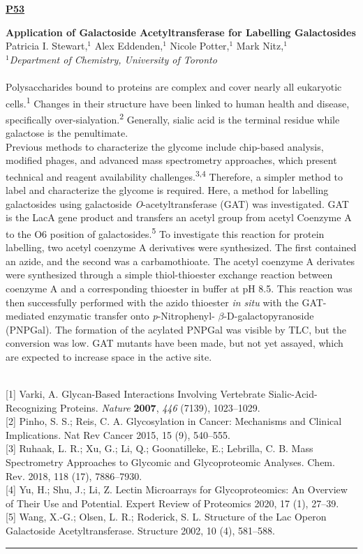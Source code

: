 \documentclass[titlepage,oneside,openany,10pt]{book}
\newenvironment{posterabswref}[5] %
        {
        \newcommand{\posterref}{#5}
	\begin{flushright}
                \underline{\textbf{#4}}
        \end{flushright}
        \textbf{#1}\\%
        #2\\%
        \textit{#3}\\\\%
        }
        {
        \vspace{0.5cm}
        \\\noindent \posterref \\ \noindent\rule{15cm}{0.5pt}%
        }
\begin{document}
\begin{posterabswref}
	{Application of Galactoside Acetyltransferase for Labelling Galactosides}
	{Patricia I. Stewart,$^{1}$ Alex Eddenden,$^{1}$ Nicole Potter,$^{1}$ Mark Nitz,$^{1}$}
	{
	$^1$Department of Chemistry, University of Toronto
	}
	{P53}
	{
	{[1]} Varki, A. Glycan-Based Interactions Involving Vertebrate Sialic-Acid-Recognizing Proteins. \emph{Nature}  \textbf{2007}, \emph{446} (7139), 1023--1029.\\
	{[2]} Pinho, S. S.; Reis, C. A. Glycosylation in Cancer: Mechanisms and Clinical Implications. Nat Rev Cancer 2015, 15 (9), 540--555.\\
	{[3]} Ruhaak, L. R.; Xu, G.; Li, Q.; Goonatilleke, E.; Lebrilla, C. B. Mass Spectrometry Approaches to Glycomic and Glycoproteomic Analyses. Chem. Rev. 2018, 118 (17), 7886--7930.\\
	{[4]} Yu, H.; Shu, J.; Li, Z. Lectin Microarrays for Glycoproteomics: An Overview of Their Use and Potential. Expert Review of Proteomics 2020, 17 (1), 27--39.\\
	{[5]} Wang, X.-G.; Olsen, L. R.; Roderick, S. L. Structure of the Lac Operon Galactoside Acetyltransferase. Structure 2002, 10 (4), 581--588.
	}
	Polysaccharides bound to proteins are complex and cover nearly all eukaryotic cells.\textsuperscript{1} Changes in their structure have been linked to human health and disease, specifically over-sialyation.\textsuperscript{2} Generally, sialic acid is the terminal residue while galactose is the penultimate.\\Previous methods to characterize the glycome include chip-based analysis, modified phages, and advanced mass spectrometry approaches, which present technical and reagent availability challenges.\textsuperscript{3,4} Therefore, a simpler method to label and characterize the glycome is required. Here, a method for labelling galactosides using galactoside \emph{O}-acetyltransferase (GAT) was investigated. GAT is the LacA gene product and transfers an acetyl group from acetyl Coenzyme A to the O6 position of galactosides.\textsuperscript{5} To investigate this reaction for protein labelling, two acetyl coenzyme A derivatives were synthesized. The first contained an azide, and the second was a carbamothioate. The acetyl coenzyme A derivates were synthesized through a simple thiol-thioester exchange reaction between coenzyme A and a corresponding thioester in buffer at pH 8.5. This reaction was then successfully performed with the azido thioester \emph{in situ} with the GAT-mediated enzymatic transfer onto \emph{p}-Nitrophenyl- $\beta$-D-galactopyranoside (PNPGal). The formation of the acylated PNPGal was visible by TLC, but the conversion was low. GAT mutants have been made, but not yet assayed, which are expected to increase space in the active site.
	\label{StewartP}
\end{posterabswref}
\end{document}
